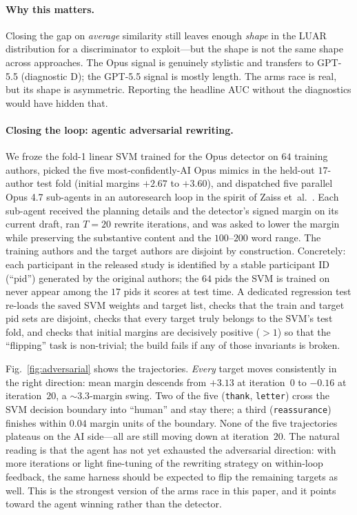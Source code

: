 \documentclass[runningheads]{llncs}
\begin{document}
\paragraph{Why this matters.}
Closing the gap on \emph{average} similarity still leaves enough
\emph{shape} in the LUAR distribution for a discriminator to
exploit---but the shape is not the same shape across approaches.
The Opus signal is genuinely stylistic and transfers to GPT-5.5
(diagnostic D); the GPT-5.5 signal is mostly length. The arms race
is real, but its shape is asymmetric. Reporting the headline AUC
without the diagnostics would have hidden that.

\paragraph{Closing the loop: agentic adversarial rewriting.}
We froze the fold-1 linear SVM trained for the Opus detector on
$64$ training authors, picked the five most-confidently-AI Opus
mimics in the held-out $17$-author test fold (initial margins
$+2.67$ to $+3.60$), and dispatched five parallel Opus 4.7
sub-agents in an autoresearch loop in the spirit of
Zaiss et~al.~\cite{zaiss2026agent4mr}. Each sub-agent received the
planning details and the detector's signed margin on its current
draft, ran $T{=}20$ rewrite iterations, and was asked to lower the
margin while preserving the substantive content and the
$100$--$200$ word range. The training authors and the target
authors are disjoint by construction. Concretely: each participant
in the released study is identified by a stable participant ID
(``pid'') generated by the original authors; the $64$ pids the SVM
is trained on never appear among the $17$ pids it scores at test
time. A dedicated regression test re-loads the saved SVM weights and
target list, checks that the train and target pid sets are disjoint,
checks that every target truly belongs to the SVM's test fold, and
checks that initial margins are decisively positive ($>1$) so that
the ``flipping'' task is non-trivial; the build fails if any of those
invariants is broken.

Fig.~\ref{fig:adversarial} shows the trajectories.
\emph{Every} target moves consistently in the right direction:
mean margin descends from $+3.13$ at iteration~$0$ to $-0.16$ at
iteration~$20$, a $\sim$$3.3$-margin swing. Two of the five
(\texttt{thank}, \texttt{letter}) cross the SVM decision boundary
into ``human'' and stay there; a third (\texttt{reassurance})
finishes within $0.04$ margin units of the boundary. None of the
five trajectories plateaus on the AI side---all are still moving
down at iteration~$20$. The natural reading is that the agent has
not yet exhausted the adversarial direction: with more iterations
or light fine-tuning of the rewriting strategy on within-loop
feedback, the same harness should be expected to flip the remaining
targets as well. This is the strongest version of the arms race in
this paper, and it points toward the agent winning rather than the
detector.
\end{document}
